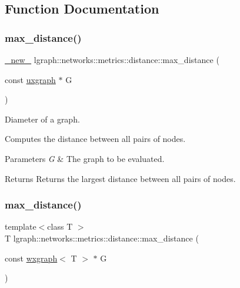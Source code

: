 \subsection{Function Documentation}
\mbox{\label{namespacelgraph_1_1networks_1_1metrics_1_1distance_aece06d66c458437b25854dc04f317a9b}} 
\subsubsection{\texorpdfstring{max\+\_\+distance()}{max\_distance()}\hspace{0.1cm}{\footnotesize\ttfamily [1/4]}}
{\footnotesize\ttfamily \hyperlink{namespacelgraph_aa930092705699c3af78e3a4de7880a3f}{\+\_\+new\+\_\+} lgraph\+::networks\+::metrics\+::distance\+::max\+\_\+distance (\begin{DoxyParamCaption}\item[{const \hyperlink{classlgraph_1_1uxgraph}{uxgraph} $\ast$}]{G }\end{DoxyParamCaption})}



Diameter of a graph. 

Computes the distance between all pairs of nodes.


\begin{DoxyParams}{Parameters}
{\em G} & The graph to be evaluated. \\
\hline
\end{DoxyParams}
\begin{DoxyReturn}{Returns}
Returns the largest distance between all pairs of nodes. 
\end{DoxyReturn}
\mbox{\label{namespacelgraph_1_1networks_1_1metrics_1_1distance_ab497d212293a672c1b511f3e9224603d}} 
\subsubsection{\texorpdfstring{max\+\_\+distance()}{max\_distance()}\hspace{0.1cm}{\footnotesize\ttfamily [2/4]}}
{\footnotesize\ttfamily template$<$class T $>$ \\
T lgraph\+::networks\+::metrics\+::distance\+::max\+\_\+distance (\begin{DoxyParamCaption}\item[{const \hyperlink{classlgraph_1_1wxgraph}{wxgraph}$<$ T $>$ $\ast$}]{G }\end{DoxyParamCaption})}



